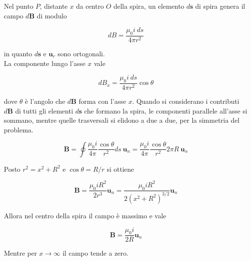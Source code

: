 Nel punto $P$, distante $x$ da centro $O$ della spira, un elemento $d \mathbf{s}$ di spira genera il campo $d \mathbf{B}$ di modulo 

\begin{equation*}
    dB = \frac{\mu_0 i \ ds}{4 \pi r^2}
\end{equation*}

in quanto $d \mathbf{s}$ e $\mathbf{u}_r$ sono ortogonali. \\

La componente lungo l'asse $x$ vale 

\begin{equation*}
    dB_x = \frac{\mu_0 i \ ds}{4 \pi r^2} \cos \theta
\end{equation*}

dove $\theta$ è l'angolo che $d \mathbf{B}$ forma con l'asse $x$. Quando si considerano i contributi $d \mathbf{B}$ di tutti gli elementi $d \mathbf{s}$ che formano la spira, le componenti parallele all'asse si sommano, mentre quelle trasversali si elidono a due a due, per la simmetria del problema.

\begin{equation*}
    \mathbf{B} = \oint \frac{\mu_0 i}{4 \pi} \frac{\cos \theta}{r^2} ds \ \mathbf{u}_n = \frac{\mu_0 i}{4 \pi} \frac{\cos \theta}{r^2} 2 \pi R \ \mathbf{u}_n
\end{equation*}

Posto $r^2 = x^2 + R^2$ e $\cos \theta = R/r$ si ottiene 

\begin{tcolorbox}[colback=yellow!10!white, colframe=orange!70!black, boxrule=0.8pt]
\begin{equation} \label{eq:campo_spira_circolare}
    \mathbf{B} = \frac{\mu_0 i R^2}{2 r^3} \mathbf{u}_n = \frac{\mu_0 i R^2}{2 (x^2 + R^2)^{3/2}} \mathbf{u}_n
\end{equation}
\end{tcolorbox}

Allora nel centro della spira il campo è massimo e vale 

\begin{tcolorbox}[colback=yellow!10!white, colframe=orange!70!black, boxrule=0.8pt]
\begin{equation} 
    \mathbf{B} = \frac{\mu_0 i }{2 R} \mathbf{u}_n
\end{equation}
\end{tcolorbox}

Mentre per $x \to \infty$ il campo tende a zero.

